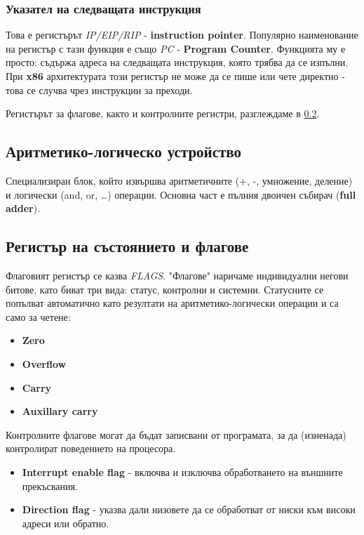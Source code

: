 \documentclass[fleqn,12pt]{article}
\begin{document}
\subsubsection{Указател на следващата инструкция}
Това е регистърът \textit{IP/EIP/RIP} - \textbf{instruction pointer}. Популярно наименование на регистър с тази функция е също 
\textit{PC} - \textbf{Program Counter}. Функцията му е просто: съдържа адреса на следващата инструкция, която трябва да се изпълни.
При \textbf{x86} архитектурата този регистър не може да се пише или чете директно - това се случва чрез инструкции за преходи.

Регистърът за флагове, както и контролните регистри, разглеждаме в \ref{section:flags}.

\subsection{Аритметико-логическо устройство}
Специализиран блок, който извършва аритметичните (+, -, умножение, деление) и логически (and, or, \dots) операции. Основна част е пълния двоичен събирач (\textbf{full adder}).

\subsection{Регистър на състоянието и флагове}
\label{section:flags}
Флаговият регистър се казва \textit{FLAGS}. "Флагове" наричаме индивидуални негови битове, като биват три вида: статус, контролни и системни.
Статусните се попълват автоматично като резултати на аритметико-логически операции и са само за четене:
\begin{itemize}
    \item \textbf{Zero}
    \item \textbf{Overflow}
    \item \textbf{Carry}
    \item \textbf{Auxillary carry}
\end{itemize}

Контролните флагове могат да бъдат записвани от програмата, за да (изненада) контролират поведението на процесора.
\begin{itemize}
    \item \textbf{Interrupt enable flag} - включва и изключва обработването на външните прекъсвания.
    \item \textbf{Direction flag} - указва дали низовете да се обработват от ниски към високи адреси или обратно.
\end{itemize}
\end{document}

